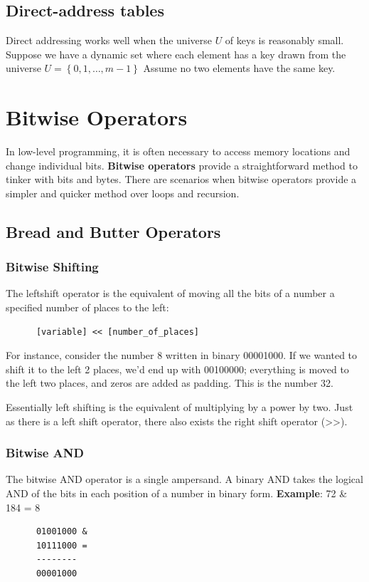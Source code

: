 \documentclass[]{book}
\begin{document}
    \section{Direct-address tables}
      Direct addressing works well when the universe $U$ of keys is reasonably small.
      Suppose we have a dynamic set where each element has a key drawn from the universe $U = \left\{ 0,1, \ldots, m - 1 \right\}$
      Assume no two elements have the same key.

  \chapter{Bitwise Operators}
    In low-level programming, it is often necessary to access memory locations and change individual bits.
    \textbf{Bitwise operators} provide a straightforward method to tinker with bits and bytes. There are
    scenarios when bitwise operators provide a simpler and quicker method over loops and recursion.
    \section{Bread and Butter Operators}
    \subsection*{Bitwise Shifting}
    The leftshift operator is the equivalent of moving all the bits of a number a specified number of places to the left:
    \begin{verbatim}
      [variable] << [number_of_places]
    \end{verbatim}
    For instance, consider the number 8 written in binary 00001000. If we wanted to shift it to the left 2 places, we'd end up with
    00100000; everything is moved to the left two places, and zeros are added as padding. This is the number 32.

    Essentially left shifting is the equivalent of multiplying by a power by two. Just as there is a left shift operator, there also exists
    the right shift operator (\textgreater\textgreater).
    \pagebreak

    \subsection*{Bitwise AND}
    The bitwise AND operator is a single ampersand. A binary AND takes the logical AND of the bits
    in each position of a number in binary form. \textbf{Example}: 72 \& 184 = 8
    \begin{verbatim}
      01001000 &
      10111000 =
      --------
      00001000
    \end{verbatim}
\end{document}
